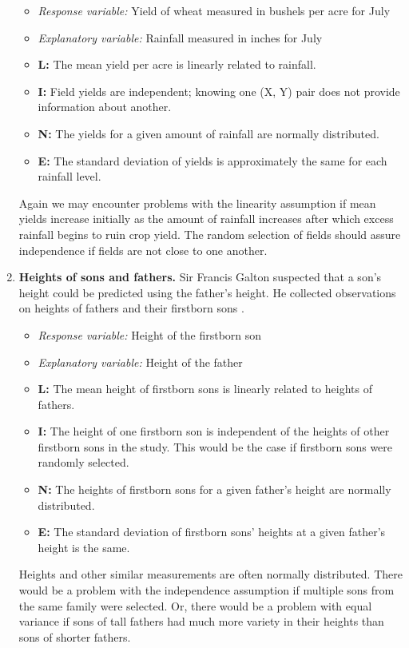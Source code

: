 \documentclass[
]{krantz}
\begin{document}
\begin{enumerate}
  \begin{itemize}
  \item
    \emph{Response variable:} Yield of wheat measured in bushels per acre for July
  \item
    \emph{Explanatory variable:} Rainfall measured in inches for July
  \item
    \textbf{L:} The mean yield per acre is linearly related to rainfall.
  \item
    \textbf{I:} Field yields are independent; knowing one (X, Y) pair does not provide information about another.
  \item
    \textbf{N:} The yields for a given amount of rainfall are normally distributed.
  \item
    \textbf{E:} The standard deviation of yields is approximately the same for each rainfall level.
  \end{itemize}

  Again we may encounter problems with the linearity assumption if mean yields increase initially as the amount of rainfall increases after which excess rainfall begins to ruin crop yield. The random selection of fields should assure independence if fields are not close to one another.
\item
  \textbf{Heights of sons and fathers.} Sir Francis Galton suspected that a son's height could be predicted using the father's height. He collected observations on heights of fathers and their firstborn sons \citep{Stigler2002}.

  \begin{itemize}
  \item
    \emph{Response variable:} Height of the firstborn son
  \item
    \emph{Explanatory variable:} Height of the father
  \item
    \textbf{L:} The mean height of firstborn sons is linearly related to heights of fathers.
  \item
    \textbf{I:} The height of one firstborn son is independent of the heights of other firstborn sons in the study. This would be the case if firstborn sons were randomly selected.
  \item
    \textbf{N:} The heights of firstborn sons for a given father's height are normally distributed.
  \item
    \textbf{E:} The standard deviation of firstborn sons' heights at a given father's height is the same.
  \end{itemize}

  Heights and other similar measurements are often normally distributed. There would be a problem with the independence assumption if multiple sons from the same family were selected. Or, there would be a problem with equal variance if sons of tall fathers had much more variety in their heights than sons of shorter fathers.
\end{enumerate}
\end{document}
